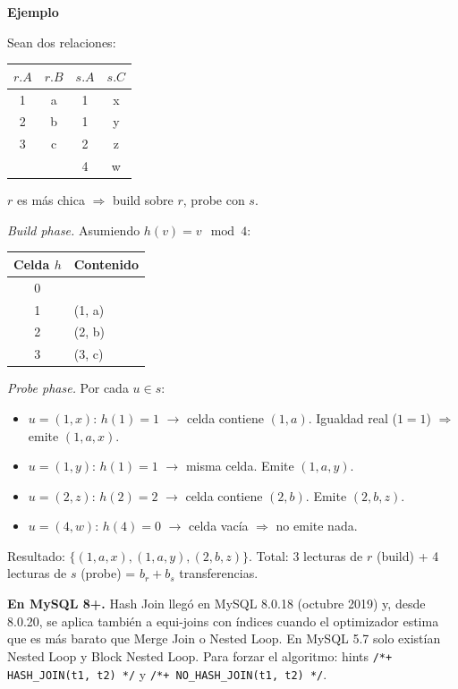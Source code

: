 \documentclass[11pt,a4paper]{article}
\newcommand{\itemcabecera}[1]{\noindent\textbf{#1}\par\medskip}
\newcommand{\bloqueEjemplo}{\itemcabecera{Ejemplo}}
\begin{document}
\bloqueEjemplo

Sean dos relaciones:

\begin{center}
\begin{tabular}{cc|cc}
\toprule
$r.A$ & $r.B$ & $s.A$ & $s.C$ \\
\midrule
1 & a & 1 & x \\
2 & b & 1 & y \\
3 & c & 2 & z \\
  &   & 4 & w \\
\bottomrule
\end{tabular}
\end{center}

$r$ es más chica $\Rightarrow$ build sobre $r$, probe con $s$.

\textit{Build phase.} Asumiendo $h(v) = v \mod 4$:

\begin{center}
\begin{tabular}{c|l}
\toprule
Celda $h$ & Contenido \\
\midrule
0 &  \\
1 & (1, a) \\
2 & (2, b) \\
3 & (3, c) \\
\bottomrule
\end{tabular}
\end{center}

\textit{Probe phase.} Por cada $u \in s$:

\begin{itemize}
    \item $u = (1, x)$: $h(1) = 1$ $\to$ celda contiene $(1, a)$. Igualdad real ($1 = 1$) $\Rightarrow$ emite $(1, a, x)$.
    \item $u = (1, y)$: $h(1) = 1$ $\to$ misma celda. Emite $(1, a, y)$.
    \item $u = (2, z)$: $h(2) = 2$ $\to$ celda contiene $(2, b)$. Emite $(2, b, z)$.
    \item $u = (4, w)$: $h(4) = 0$ $\to$ celda vacía $\Rightarrow$ no emite nada.
\end{itemize}

Resultado: $\{(1,a,x), (1,a,y), (2,b,z)\}$. Total: 3 lecturas de $r$ (build) + 4 lecturas de $s$ (probe) = $b_r + b_s$ transferencias.

\begin{nota}
\textbf{En MySQL 8+.} Hash Join llegó en MySQL 8.0.18 (octubre 2019) y, desde 8.0.20, se aplica también a equi-joins con índices cuando el optimizador estima que es más barato que Merge Join o Nested Loop. En MySQL 5.7 solo existían Nested Loop y Block Nested Loop. Para forzar el algoritmo: hints \texttt{/*+ HASH\_JOIN(t1, t2) */} y \texttt{/*+ NO\_HASH\_JOIN(t1, t2) */}.
\end{nota}
\end{document}
